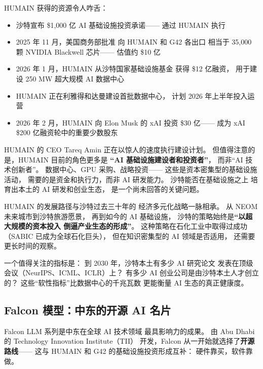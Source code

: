 HUMAIN 获得的资源令人咋舌：
\begin{itemize}[noitemsep]
  \item 沙特宣布 \$1,000 亿 AI 基础设施投资承诺——
        通过 HUMAIN 执行
  \item 2025 年 11 月，美国商务部批准
        向 HUMAIN 和 G42 各出口
        相当于 35,000 颗 NVIDIA Blackwell 芯片——
        估值约 \$10 亿
  \item 2026 年 1 月，HUMAIN 从沙特国家基础设施基金
        获得 \$12 亿融资，
        用于建设 250 MW 超大规模 AI 数据中心
  \item HUMAIN 正在利雅得和达曼建设首批数据中心，
        计划 2026 年上半年投入运营
  \item 2026 年 2 月，HUMAIN 向 Elon Musk 的 xAI
        投资 \$30 亿——
        成为 xAI \$200 亿融资轮中的重要少数股东
\end{itemize}

HUMAIN 的 CEO Tareq Amin
正在以惊人的速度执行建设计划。
但值得注意的是，HUMAIN 目前的角色更多是
\textbf{``AI 基础设施建设者和投资者''}，
而非``AI 技术创新者''。
数据中心、GPU 采购、战略投资——
这些是资本密集型的基础设施活动，
需要的是资金和执行力，而非 AI 研发能力。
沙特能否在基础设施之上
培育出本土的 AI 研发和创业生态，
是一个尚未回答的关键问题。

HUMAIN 的发展路径与沙特过去三十年的
经济多元化战略一脉相承。
从 NEOM 未来城市到沙特旅游愿景，
再到如今的 AI 基础设施，
沙特的策略始终是\textbf{``以超大规模的资本投入
倒逼产业生态的形成''}。
这种策略在石化工业中取得过成功
（SABIC 已成为全球石化巨头），
但在知识密集型的 AI 领域是否适用，
还需要更长时间的观察。

一个值得关注的指标是：
到 2030 年，沙特本土有多少 AI 研究论文
发表在顶级会议（NeurIPS、ICML、ICLR）上？
有多少 AI 创业公司是由沙特本土人才创立的？
这些``软性指标''比数据中心的千兆瓦数
更能衡量 AI 生态的真正健康度。

\subsection{Falcon 模型：中东的开源 AI 名片}

Falcon LLM 系列是中东在全球 AI 技术领域
最具影响力的成果。
由 Abu Dhabi 的 Technology Innovation Institute（TII）
开发，Falcon 从一开始就选择了\textbf{开源路线}——
这与 HUMAIN 和 G42 的基础设施投资形成互补：
硬件靠买，软件靠做。

